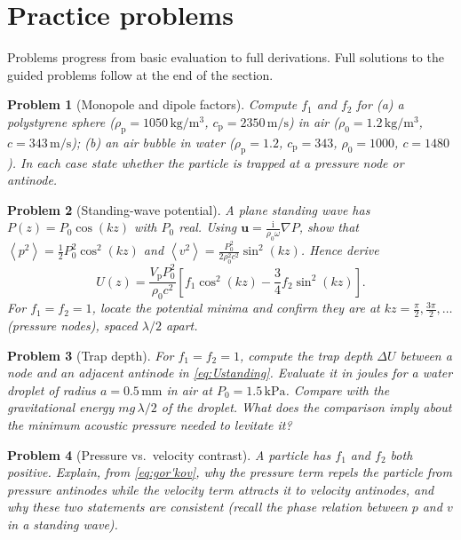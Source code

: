 \documentclass[11pt]{article}
\newtheorem{problem}{Problem}[section]
\newcommand{\pp}{\rho_{\mathrm{p}}}
\newcommand{\rrho}{\rho_{0}}
\newcommand{\vp}{V_{\mathrm{p}}}
\newcommand{\avg}[1]{\left\langle #1 \right\rangle}
\newcommand{\vpSq}{\avg{p^{2}}}
\newcommand{\vvSq}{\avg{v^{2}}}
\newcommand{\ii}{\mathrm{i}}
\newcommand{\uu}{\mathbf{u}}
\begin{document}
\section{Practice problems}
\label{sec:problems}

Problems progress from basic evaluation to full derivations. Full solutions to
the guided problems follow at the end of the section.

\begin{problem}[Monopole and dipole factors]\label{prob:f1f2}
Compute $f_1$ and $f_2$ for (a) a polystyrene sphere
($\pp=1050\,\mathrm{kg/m^3}$, $c_{\mathrm{p}}=2350\,\mathrm{m/s}$) in air
($\rrho=1.2\,\mathrm{kg/m^3}$, $c=343\,\mathrm{m/s}$); (b) an air bubble in
water ($\pp=1.2$, $c_{\mathrm{p}}=343$, $\rrho=1000$, $c=1480$). In each case
state whether the particle is trapped at a pressure node or antinode.
\end{problem}

\begin{problem}[Standing-wave potential]\label{prob:standing}
A plane standing wave has $P(z)=P_0\cos(kz)$ with $P_0$ real. Using
$\uu=\frac{\ii}{\rrho\omega}\nabla P$, show that
$\vpSq=\tfrac12 P_0^2\cos^2(kz)$ and
$\vvSq=\frac{P_0^2}{2\rrho^2 c^2}\sin^2(kz)$. Hence derive
\begin{equation}
  U(z)=\frac{\vp P_0^2}{\rrho c^2}\left[f_1\cos^2(kz)-\frac34 f_2\sin^2(kz)\right].
  \label{eq:Ustanding}
\end{equation}
For $f_1=f_2=1$, locate the potential minima and confirm they are at
$kz=\frac\pi2,\frac{3\pi}2,\dots$ (pressure nodes), spaced $\lambda/2$ apart.
\end{problem}

\begin{problem}[Trap depth]\label{prob:depth}
For $f_1=f_2=1$, compute the trap depth $\Delta U$ between a node and an
adjacent antinode in \eqref{eq:Ustanding}. Evaluate it in joules for a water
droplet of radius $a=0.5\,\mathrm{mm}$ in air at
$P_0=1.5\,\mathrm{kPa}$. Compare with the gravitational energy
$m g\,\lambda/2$ of the droplet. What does the comparison imply about the
minimum acoustic pressure needed to levitate it?
\end{problem}

\begin{problem}[Pressure vs.\ velocity contrast]\label{prob:contrast}
A particle has $f_1$ and $f_2$ both positive. Explain, from
\eqref{eq:gor'kov}, why the pressure term \emph{repels} the particle from
pressure antinodes while the velocity term \emph{attracts} it to velocity
antinodes, and why these two statements are consistent (recall the phase
relation between $p$ and $v$ in a standing wave).
\end{problem}
\end{document}
